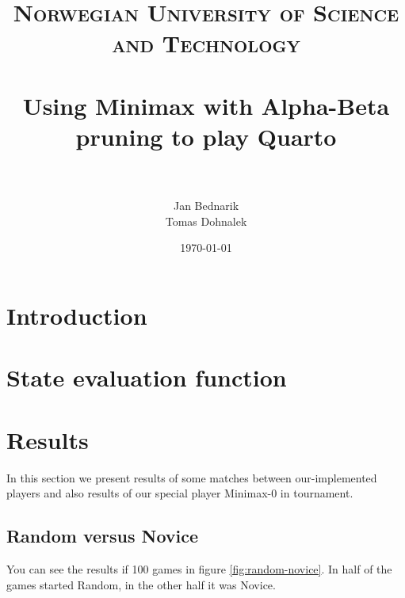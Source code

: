 \documentclass[paper=a4, fontsize=11pt]{article} %
\title{	
\normalfont \normalsize 
\textsc{Norwegian University of Science and Technology} \\ [25pt] %
\horrule{0.5pt} \\[0.4cm] %
\huge Using Minimax with Alpha-Beta pruning to play Quarto\\ %
\horrule{2pt} \\[0.5cm] %
}
\author{Jan Bednarik\\Tomas Dohnalek} %
\date{\normalsize\today} %
\begin{document}
\maketitle %

\section{Introduction}
\section{State evaluation function}
\section{Results}

In this section we present results of some matches between our-implemented players and also results of our special player Minimax-0 in tournament.

\subsection{Random versus Novice}
You can see the results if 100 games in figure \ref{fig:random-novice}. 
In half of the games started Random, in the other half it was Novice.
\end{document}
